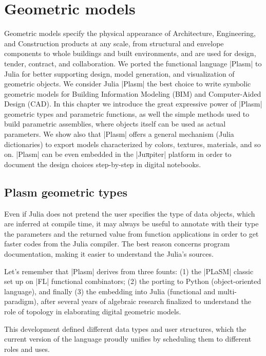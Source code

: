 
\chapter{Geometric models}
\label{chapt:4}

Geometric models specify the physical appearance of Architecture, Engineering, and Construction products at any scale, from structural and envelope components to whole buildings and built environments, and are used for design, tender, contract, and collaboration. We ported the  functional language |Plasm| to Julia for better supporting design, model generation, and visualization of geometric objects.
We consider Julia |Plasm| the best choice to write symbolic geometric models for Building Information Modeling (BIM) and Computer-Aided Design (CAD).  
In this chapter we introduce the great expressive power of |Plasm| geometric types and parametric functions, as well the simple methods used to build parametric assemblies, where objects itself can be used as actual parameters. We show also that |Plasm| offers a  general mechanism (Julia dictionaries) to export models characterized by colors, textures, materials, and so on. |Plasm| can be even embedded in the |Juπpiter| platform in order to document the design choices step-by-step in digital notebooks.

\section{Plasm geometric types}\label{sect:4-1}

Even if Julia does not pretend the user specifies the type of data objects, which are inferred at compile time, it may always be useful to annotate with their type the parameters and the returned value from function applications in order to get faster codes from the Julia compiler. The best reason concerns program documentation, making it easier to understand the Julia's sources.

Let's remember that |Plasm| derives from three founts: (1) the |PLaSM| classic set up on |FL| functional combinators; (2) the porting to Python (object-oriented language), and finally (3) the embedding into Julia (functional and multi-paradigm), after several years of algebraic research finalized to understand the role of topology in elaborating digital  geometric models. 

This development defined different data types and user structures, which the current version of the language proudly unifies by scheduling them to different roles and uses.
 

